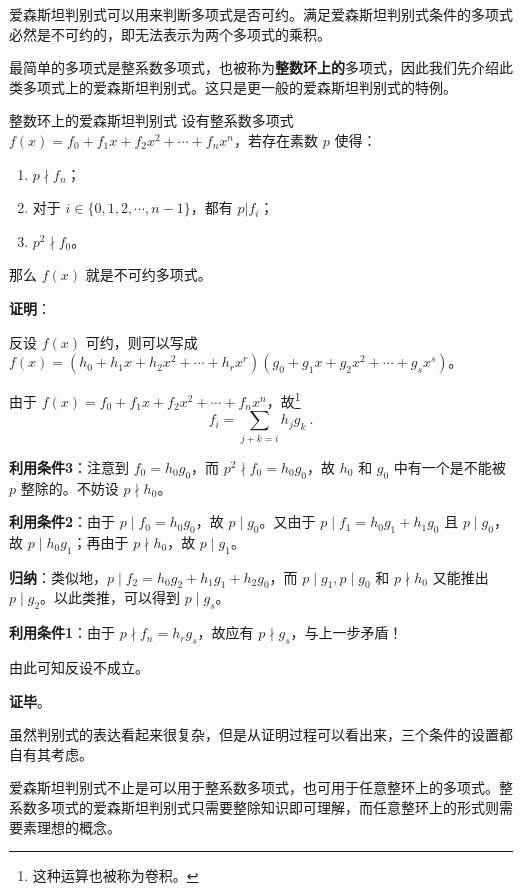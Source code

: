 
爱森斯坦判别式可以用来判断多项式是否可约。满足爱森斯坦判别式条件的多项式必然是不可约的，即无法表示为两个多项式的乘积。

最简单的多项式是整系数多项式，也被称为\textbf{整数环上的}多项式，因此我们先介绍此类多项式上的爱森斯坦判别式。这只是更一般的爱森斯坦判别式的特例。

\begin{theorem}{整数环上的爱森斯坦判别式}\label{the_EsstCr_1}
设有整系数多项式 $f(x)=f_0+f_1x+f_2x^2+\cdots+f_nx^n$，若存在素数 $p$ 使得：
\begin{enumerate}
\item $p\nmid f_n$；
\item 对于 $i\in\{0, 1, 2, \cdots, n-1\}$，都有 $p|f_i$；
\item $p^2\nmid f_0$。
\end{enumerate}
那么 $f(x)$ 就是不可约多项式。
\end{theorem}

\textbf{证明}：

反设 $f(x)$ 可约，则可以写成 $f(x)=(h_0+h_1x+h_2x^2+\cdots+h_rx^r)(g_0+g_1x+g_2x^2+\cdots+g_sx^s)$。

由于 $f(x)=f_0+f_1x+f_2x^2+\cdots+f_nx^n$，故\footnote{这种运算也被称为卷积。}\begin{equation}f_i=\sum\limits_{j+k=i}h_jg_k~.\end{equation}

\textbf{利用条件3}：注意到 $f_0=h_0g_0$，而 $p^2\nmid f_0=h_0g_0$，故 $h_0$ 和 $g_0$ 中有一个是不能被 $p$ 整除的。不妨设 $p\nmid h_0$。

\textbf{利用条件2}：由于 $p\mid f_0=h_0g_0$，故 $p\mid g_0$。又由于 $p\mid f_1=h_0g_1+h_1g_0$ 且 $p\mid g_0$，故 $p\mid h_0g_1$；再由于 $p\nmid h_0$，故 $p\mid g_1$。

\textbf{归纳}：类似地，$p\mid f_2=h_0g_2+h_1g_1+h_2g_0$，而 $p\mid g_1, p\mid g_0$ 和 $p\nmid h_0$ 又能推出 $p\mid g_2$。以此类推，可以得到 $p\mid g_s$。

\textbf{利用条件1}：由于 $p\nmid f_n=h_rg_s$，故应有 $p\nmid g_s$，与上一步矛盾！

由此可知反设不成立。

\textbf{证毕}。

虽然判别式的表达看起来很复杂，但是从证明过程可以看出来，三个条件的设置都自有其考虑。

爱森斯坦判别式不止是可以用于整系数多项式，也可用于任意整环上的多项式。整系数多项式的爱森斯坦判别式只需要整除知识即可理解，而任意整环上的形式则需要素理想的概念。

